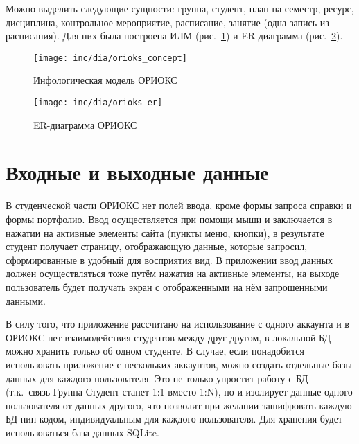 Можно выделить следующие сущности: группа, студент, план на семестр, ресурс, дисциплина, контрольное мероприятие, расписание, занятие (одна запись из расписания).
Для них была построена ИЛМ (рис.~\ref{fig:orioksConcept}) и ER-диаграмма (рис.~\ref{fig:orioksEr}).

\nocite{db}
\begin{figure}[H]
  \centering
  \texttt{[image: inc/dia/orioks\_concept]}
  \caption{Инфологическая модель ОРИОКС}
  \label{fig:orioksConcept}
\end{figure}

\begin{figure}[ht]
  \centering
  \texttt{[image: inc/dia/orioks\_er]}
  \caption{ER-диаграмма ОРИОКС}
  \label{fig:orioksEr}
\end{figure}

\section{Входные и выходные данные}
\label{sec:io}
В студенческой части ОРИОКС нет полей ввода, кроме формы запроса справки и формы портфолио.
Ввод осуществляется при помощи мыши и заключается в нажатии на активные элементы сайта (пункты меню, кнопки), в результате студент получает страницу, отображающую данные, которые запросил, сформированные в удобный для восприятия вид.
В приложении ввод данных должен осуществляться тоже путём нажатия на активные элементы, на выходе пользователь будет получать экран с отображенными на нём запрошенными данными.

В силу того, что приложение рассчитано на использование с одного аккаунта и в ОРИОКС нет взаимодействия студентов между друг другом, в локальной БД можно хранить только об одном студенте.
В случае, если понадобится использовать приложение с нескольких аккаунтов, можно создать отдельные базы данных для каждого пользователя.
Это не только упростит работу с БД (т.к.\ связь Группа-Студент станет 1:1 вместо 1:N), но и изолирует данные одного пользователя от данных другого, что позволит при желании зашифровать каждую БД пин-кодом, индивидуальным для каждого пользователя.
Для хранения будет использоваться база данных SQLite.


